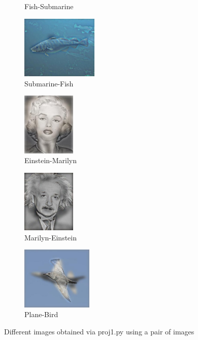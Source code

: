\documentclass{bmvc2k}
\begin{document}
\begin{figure}[h!]
\begin{subfigure}[b]{0.3\linewidth}
    \caption{Fish-Submarine}
  \end{subfigure}
  \begin{subfigure}[b]{0.3\linewidth}
    \includegraphics[width=\linewidth, height=3cm]{images/Sub_Fish/hybrid_image_submarine_fish.jpg}
    \caption{Submarine-Fish}
  \end{subfigure}
  \begin{subfigure}[b]{0.3\linewidth}
    \includegraphics[width=\linewidth, height=3cm]{images/Einstein_Marilyn/hybrid_image_einstein_marilyn.jpg}
    \caption{Einstein-Marilyn}
  \end{subfigure}
  \begin{subfigure}[b]{0.3\linewidth}
    \includegraphics[width=\linewidth, height=3cm]{images/Marilyn_Einstein/hybrid_image_marilyn_einstein.jpg}
    \caption{Marilyn-Einstein}
  \end{subfigure}
  \begin{subfigure}[b]{0.3\linewidth}
    \includegraphics[width=\linewidth, height=3cm]{images/Plane_Bird/hybrid_image_plane_bird.jpg}
    \caption{Plane-Bird}
  \end{subfigure}
  \caption{Different images obtained via proj1.py using a pair of images}
  \label{fig:coffee3}
\end{figure}
\end{document}
